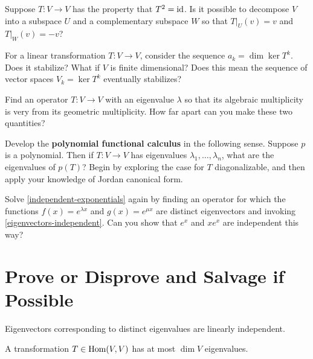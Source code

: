 \documentclass{homework}
\begin{document}
\begin{problem}
  Suppose $T : V \to V$ has the property that $T^2 = \operatorname{id}$.  Is it possible to decompose
  $V$ into a subspace $U$ and a complementary subspace $W$ so that
  $T |_U(v) = v$ and $T |_W(v) = -v$?
\end{problem}

\begin{problem}
  For a linear transformation $T : V \to V$, consider the sequence
  $a_k = \dim \ker T^k$.  Does it stabilize?  What if $V$ is finite
  dimensional?  Does this mean the sequence of vector
  spaces $V_k = \ker T^k$ eventually stabilizes?
\end{problem}

\begin{problem}
  Find an operator $T : V \to V$ with an eigenvalue $\lambda$ so that its algebraic multiplicity is very from its geometric multiplicity.  How far apart can you make these two quantities?
\end{problem}

\begin{problem}
  Develop the \textbf{polynomial functional calculus} in the following sense.  Suppose $p$ is a polynomial.  Then if $T : V \to V$ has eigenvalues $\lambda_1, \ldots, \lambda_n$, what are the eigenvalues of $p(T)$?  Begin by exploring the case for $T$ diagonalizable, and then apply your knowledge of Jordan canonical form.
\end{problem}

\begin{problem}
  Solve \ref{independent-exponentials} again by finding an operator for which the functions $f(x) = e^{\lambda x}$ and $g(x) = e^{\mu x}$ are distinct eigenvectors and invoking \ref{eigenvectors-independent}.  Can you show that $e^x$ and $xe^x$ are independent this way?
\end{problem}

\section{Prove or Disprove and Salvage if Possible}

\begin{problem}\label{eigenvectors-independent}
  Eigenvectors corresponding to distinct eigenvalues are linearly independent.
\end{problem}

\begin{problem}
  A transformation $T \in \operatorname{Hom}(V,V)$ has at most $\dim V$ eigenvalues.
\end{problem}
\end{document}
